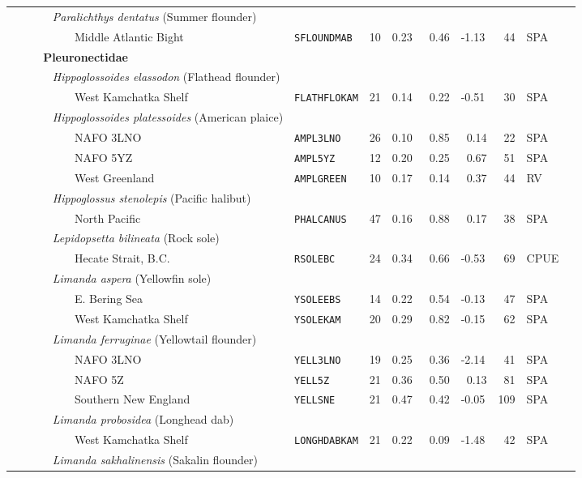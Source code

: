 \begin{flushleft}
\begin{tabular*}{7.1in}{llllllllll}
&{\it~~~~~Paralichthys dentatus} (Summer flounder)&~&~&~&~&~&~&~  & \\ 
&~~~~~~~~~Middle Atlantic Bight&{\tt SFLOUNDMAB}&10&0.23&~0.46&-1.13&~44&SPA  & \\ 
&{\bf~~~Pleuronectidae}&~&~&~&~&~&~&~  & \\ 
&{\it~~~~~Hippoglossoides elassodon} (Flathead flounder)&~&~&~&~&~&~&~  & \\ 
&~~~~~~~~~West Kamchatka Shelf&{\tt FLATHFLOKAM}&21&0.14&~0.22&-0.51&~30&SPA  & \\ 
&{\it~~~~~Hippoglossoides platessoides} (American plaice)&~&~&~&~&~&~&~  & \\ 
&~~~~~~~~~NAFO 3LNO&{\tt AMPL3LNO}&26&0.10&~0.85&~0.14&~22&SPA  & \\ 
&~~~~~~~~~NAFO 5YZ&{\tt AMPL5YZ}&12&0.20&~0.25&~0.67&~51&SPA  & \\ 
&~~~~~~~~~West Greenland&{\tt AMPLGREEN}&10&0.17&~0.14&~0.37&~44&RV  & \\ 
&{\it~~~~~Hippoglossus stenolepis} (Pacific halibut)&~&~&~&~&~&~&~  & \\ 
&~~~~~~~~~North Pacific&{\tt PHALCANUS}&47&0.16&~0.88&~0.17&~38&SPA  & \\ 
&{\it~~~~~Lepidopsetta bilineata} (Rock sole)&~&~&~&~&~&~&~  & \\ 
&~~~~~~~~~Hecate Strait, B.C.&{\tt RSOLEBC}&24&0.34&~0.66&-0.53&~69&CPUE  & \\ 
&{\it~~~~~Limanda aspera} (Yellowfin sole)&~&~&~&~&~&~&~  & \\ 
&~~~~~~~~~E. Bering Sea&{\tt YSOLEEBS}&14&0.22&~0.54&-0.13&~47&SPA  & \\ 
&~~~~~~~~~West Kamchatka Shelf&{\tt YSOLEKAM}&20&0.29&~0.82&-0.15&~62&SPA  & \\ 
&{\it~~~~~Limanda ferruginae} (Yellowtail flounder)&~&~&~&~&~&~&~  & \\ 
&~~~~~~~~~NAFO 3LNO&{\tt YELL3LNO}&19&0.25&~0.36&-2.14&~41&SPA  & \\ 
&~~~~~~~~~NAFO 5Z&{\tt YELL5Z}&21&0.36&~0.50&~0.13&~81&SPA  & \\ 
&~~~~~~~~~Southern New England&{\tt YELLSNE}&21&0.47&~0.42&-0.05&109&SPA  & \\ 
&{\it~~~~~Limanda probosidea} (Longhead dab)&~&~&~&~&~&~&~  & \\ 
&~~~~~~~~~West Kamchatka Shelf&{\tt LONGHDABKAM}&21&0.22&~0.09&-1.48&~42&SPA  & \\ 
&{\it~~~~~Limanda sakhalinensis} (Sakalin flounder)&~&~&~&~&~&~&~  & \\ 

\end{tabular*}
\end{flushleft}
